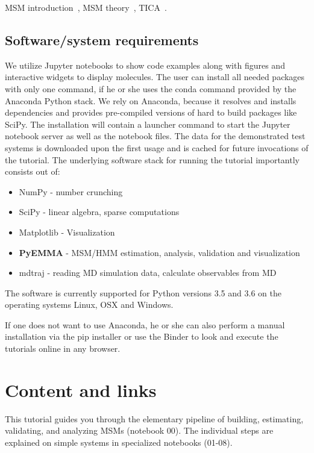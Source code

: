 \documentclass[9pt,tutorial,lineno,onehalfspacing]{livecoms}
\begin{document}
MSM introduction~\cite{msm-brooke}, MSM theory~\cite{msm-jhp,msm-book}, TICA~\cite{tica,tica3,tica2}.

\subsection{Software/system requirements}

We utilize Jupyter notebooks to show code examples along with figures and interactive widgets to display molecules. The user can install all needed packages with only one command, if he or she uses the conda command provided by the Anaconda Python stack. We rely on Anaconda, because it resolves and installs dependencies and provides pre-compiled versions of hard to build packages like SciPy. The installation will contain a launcher command to start the Jupyter notebook server as well as the notebook files. The data for the demonstrated test systems is downloaded upon the first usage and is cached for future invocations of the tutorial. The underlying software stack for running the tutorial importantly consists out of:
\begin{itemize}
 \item NumPy - number crunching
 \item SciPy - linear algebra, sparse computations
 \item Matplotlib - Visualization
 \item \textbf{PyEMMA} - MSM/HMM estimation, analysis, validation and visualization
 \item mdtraj - reading MD simulation data, calculate observables from MD
\end{itemize}

The software is currently supported for Python versions 3.5 and 3.6 on the operating systems Linux, OSX and Windows.

If one does not want to use Anaconda, he or she can also perform a manual installation via the pip installer or use the Binder to look and execute the tutorials online in any browser.


\section{Content and links}

This tutorial guides you through the elementary pipeline of building, estimating, validating, and analyzing MSMs (notebook 00). The individual steps are explained on simple systems in specialized notebooks (01-08).
\end{document}
